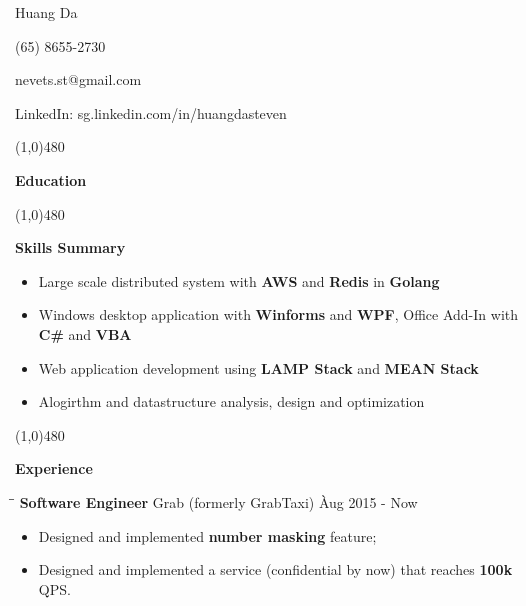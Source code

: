 \documentclass{article}
\begin{document}
\centerline{{\Huge \sc Huang Da} }
\centerline{(65) 8655-2730}
\centerline{nevets.st@gmail.com}
\centerline{LinkedIn: sg.linkedin.com/in/huangdasteven}

\noindent

\centerline{\line(1,0){480}}

\medskip

\centerline {\Large \bf Education}

\smallskip


\centerline{\line(1,0){480}}

\medskip

\centerline {\Large \bf {Skills Summary}}

\vspace{-6pt}\smallskip

\begin{itemize}[leftmargin=*]
  \item Large scale distributed system with {\bf AWS} and {\bf Redis} in {\bf Golang} \vspace{-6pt}
  \item Windows desktop application with {\bf Winforms} and {\bf WPF}, Office Add-In with {\bf C\#}  and {\bf VBA}\vspace{-6pt}
  \item Web application development using {\bf LAMP Stack} and {\bf MEAN Stack} \vspace{-6pt}
  \item Alogirthm and datastructure analysis, design and optimization \vspace{-6pt}
\end{itemize}

\centerline{\line(1,0){480}}

\medskip

\centerline {\Large \bf Experience}

\medskip


\begin{tabbing}
\hspace{2.35in}\= \hspace{2.6in}\= \kill
{\bf Software Engineer} \> Grab (formerly GrabTaxi) \`Aug 2015 - Now\
\end{tabbing}

\begin{itemize}
    \item Designed and implemented {\bf number masking} feature; \vspace{-6pt}
    \item Designed and implemented a service (confidential by now) that reaches {\bf 100k} QPS. \vspace{-6pt}
\end{itemize}
\end{document}
